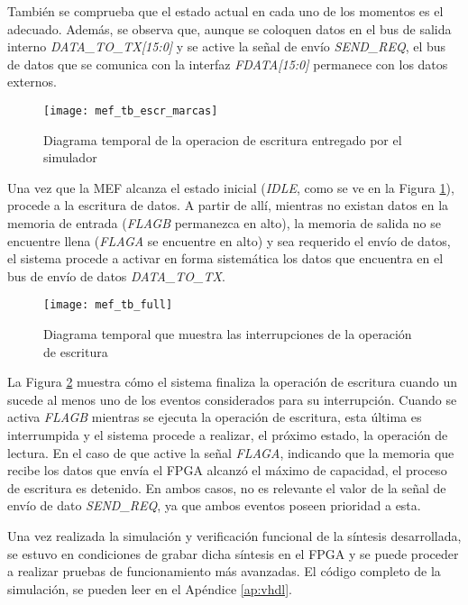 También se comprueba que el estado actual en cada uno de los momentos es el adecuado. Además, se observa que, aunque se coloquen datos en el bus de salida interno {\it DATA\_TO\_TX[15:0]} y se active la señal de envío
{\it SEND\_REQ}, el bus de datos que se comunica con la interfaz {\it FDATA[15:0]} permanece con los datos externos.

\begin{figure}[t]
	\centering
	\texttt{[image: mef\_tb\_escr\_marcas]}
	\caption{Diagrama temporal de la operacion de escritura entregado por el simulador}
	\label{tb:escr}
\end{figure}

Una vez que la MEF alcanza el estado inicial ({\it IDLE}, como se ve en la Figura \ref{tb:escr}), procede a la escritura de datos. A partir de allí, mientras no existan datos en la memoria de entrada ({\it FLAGB} permanezca en alto), la memoria de salida no se encuentre llena ({\it FLAGA} se encuentre en alto) y sea requerido el envío de datos, el sistema procede a activar en forma sistemática los datos que encuentra en el bus de envío de datos {\it DATA\_TO\_TX}.

\begin{figure}[hb]
	\centering
	\texttt{[image: mef\_tb\_full]}
	\caption{Diagrama temporal que muestra las interrupciones de la operación de escritura}
	\label{tb:inter}
\end{figure}

La Figura \ref{tb:inter} muestra cómo el sistema finaliza la operación de escritura cuando un sucede al menos uno de los eventos considerados para su interrupción. Cuando se activa {\it FLAGB} mientras se ejecuta la operación de escritura, esta última es interrumpida y el sistema procede a realizar, el próximo estado, la operación de lectura. En el caso de que active la señal {\it FLAGA}, indicando que la memoria que recibe los datos que envía el FPGA alcanzó el máximo de capacidad, el proceso de escritura es detenido. En ambos casos, no es relevante el valor de la señal de envío de dato {\it SEND\_REQ}, ya que ambos eventos poseen prioridad a esta.
 
Una vez realizada la simulación y verificación funcional de la síntesis desarrollada, se estuvo en condiciones de grabar dicha síntesis en el FPGA y se puede proceder a realizar pruebas de funcionamiento más avanzadas. 
El código completo de la simulación, se pueden leer en el Apéndice \ref{ap:vhdl}.